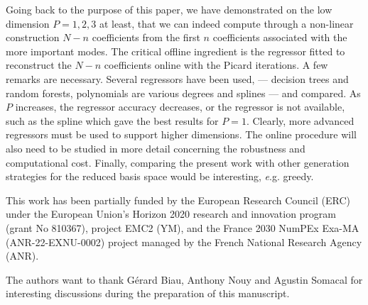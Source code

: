 \documentclass[graybox]{svmult}
\begin{document}
Going back to the purpose of this paper, we have demonstrated on the low dimension $P=1,2,3$ at least, that we can indeed compute through a non-linear construction $N-n$ coefficients from the first $n$ coefficients associated with the more important modes. The critical offline ingredient is the regressor fitted to reconstruct the $N-n$ coefficients online with the Picard iterations. A few remarks are necessary. Several regressors have been used, --- decision trees and random forests, polynomials are various degrees and splines --- and compared. As $P$ increases, the regressor accuracy decreases, or the regressor is not available, such as the spline which gave the best results for $P=1$. Clearly, more advanced regressors must be used to support higher dimensions. The online procedure will also need to be studied in more detail concerning the robustness and computational cost. Finally, comparing the present work with other generation strategies for the reduced basis space would be interesting, {\emph e.g.} greedy.

\begin{acknowledgement}
This work has been partially funded by the European Research Council (ERC) under the European
Union's Horizon 2020 research and innovation program (grant No 810367), project EMC2 (YM), and the France 2030 NumPEx Exa-MA (ANR-22-EXNU-0002) project managed by the French National Research Agency (ANR).


The authors want to thank Gérard Biau, Anthony Nouy and Agustin Somacal for interesting discussions during the preparation of this manuscript.
\end{acknowledgement}



\end{document}
